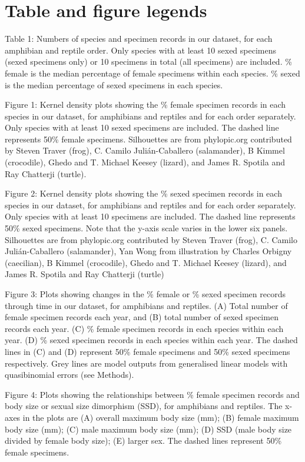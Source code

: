 \documentclass[a4paper, 12pt]{article}
\begin{document}



\newpage
\section{Table and figure legends}

Table 1: Numbers of species and specimen records in our dataset, for each amphibian and reptile order. Only species with at least 10 sexed specimens (sexed specimens only) or 10 specimens in total (all specimens) are included. \% female is the median percentage of female specimens within each species. \% sexed is the median percentage of sexed specimens in each species.

Figure 1: Kernel density plots showing the \% female specimen records in each species in our dataset, for amphibians and reptiles and for each order separately. Only species with at least 10 sexed specimens are included. The dashed line represents 50\% female specimens. Silhouettes are from phylopic.org contributed by Steven Traver (frog), C. Camilo Julián-Caballero (salamander), B Kimmel (crocodile), Ghedo and T. Michael Keesey (lizard), and James R. Spotila and Ray Chatterji (turtle).

Figure 2: Kernel density plots showing the \% sexed specimen records in each species in our dataset, for amphibians and reptiles and for each order separately. Only species with at least 10 specimens are included. The dashed line represents 50\% sexed specimens. Note that the y-axis scale varies in the lower six panels. Silhouettes are from phylopic.org contributed by Steven Traver (frog), C. Camilo Julián-Caballero (salamander), Yan Wong from illustration by Charles Orbigny (caecilian), B Kimmel (crocodile), Ghedo and T. Michael Keesey (lizard), and James R. Spotila and Ray Chatterji (turtle)

Figure 3: Plots showing changes in the \% female or \% sexed specimen records through time in our dataset, for amphibians and reptiles. (A) Total number of female specimen records each year, and (B) total number of sexed specimen records each year. (C) \% female specimen records in each species within each year. (D) \% sexed specimen records in each species within each year. The dashed lines in (C) and (D) represent 50\% female specimens and 50\% sexed specimens respectively. Grey lines are model outputs from generalised linear models with quasibinomial errors (see Methods).

Figure 4: Plots showing the relationships between \% female specimen records and body size or sexual size dimorphism (SSD), for amphibians and reptiles. The x-axes in the plots are (A) overall maximum body size (mm); (B) female maximum body size (mm); (C) male maximum body size (mm); (D) SSD (male body size divided by female body size); (E) larger sex. The dashed lines represent 50\% female specimens.
\end{document}
